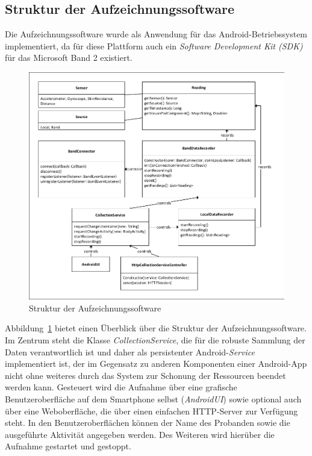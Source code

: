 \subsection{Struktur der Aufzeichnungssoftware}
Die Aufzeichnungssoftware wurde als Anwendung für das Android-Betriebssystem implementiert, da für diese Plattform auch ein \textit{Software Development Kit (SDK)} für das Microsoft Band 2 existiert.
\begin{figure}[htb]
\centering
\includegraphics[width=\textwidth, clip, trim=6mm 6mm 9mm 6mm]{img/app-structure}
\caption{Struktur der Aufzeichnungssoftware}
\label{fig:app-structure}
\end{figure}

Abbildung~\ref{fig:app-structure} bietet einen Überblick über die Struktur der Aufzeichnungssoftware. Im Zentrum steht die Klasse \textit{CollectionService}, die für die robuste Sammlung der Daten verantwortlich ist und daher als persistenter Android-\textit{Service} implementiert ist, der im Gegensatz zu anderen Komponenten einer Android-App nicht ohne weiteres durch das System zur Schonung der Ressourcen beendet werden kann. Gesteuert wird die Aufnahme über eine grafische Benutzeroberfläche auf dem Smartphone selbst (\textit{AndroidUI}) sowie optional auch über eine Weboberfläche, die über einen einfachen HTTP-Server zur Verfügung steht. In den Benutzeroberflächen können der Name des Probanden sowie die ausgeführte Aktivität angegeben werden. Des Weiteren wird hierüber die Aufnahme gestartet und gestoppt.


